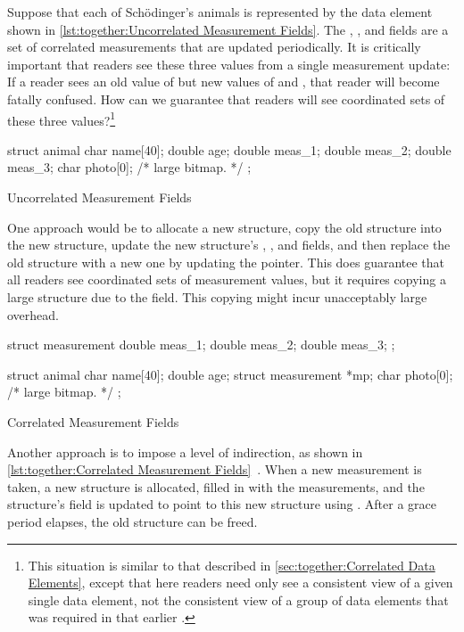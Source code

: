 Suppose that each of Sch\"odinger's animals is represented by the
data element shown in
\cref{lst:together:Uncorrelated Measurement Fields}.
The , , and  fields are a set
of correlated measurements that are updated periodically.
It is critically important that readers see these three values from
a single measurement update: If a reader sees an old value of
 but new values of  and , that
reader will become fatally confused.
How can we guarantee that readers will see coordinated sets of these
three values?\footnote{
	This situation is similar to that described in
	\cref{sec:together:Correlated Data Elements},
	except that here readers need only see a consistent view of a
	given single data element, not the consistent view of a
	group of data elements that was required in that earlier
	.}

\begin{listing}
\begin{VerbatimL}[tabsize=8]
struct animal {
	char name[40];
	double age;
	double meas_1;
	double meas_2;
	double meas_3;
	char photo[0]; /* large bitmap. */
};
\end{VerbatimL}
\caption{Uncorrelated Measurement Fields}
\label{lst:together:Uncorrelated Measurement Fields}
\end{listing}

One approach would be to allocate a new  structure,
copy the old structure into the new structure, update the new
structure's , , and  fields,
and then replace the old structure with a new one by updating
the pointer.
This does guarantee that all readers see coordinated sets of
measurement values, but it requires copying a large structure due
to the  field.
This copying might incur unacceptably large overhead.

\begin{listing}
\begin{VerbatimL}[tabsize=8]
struct measurement {
	double meas_1;
	double meas_2;
	double meas_3;
};

struct animal {
	char name[40];
	double age;
	struct measurement *mp;
	char photo[0]; /* large bitmap. */
};
\end{VerbatimL}
\caption{Correlated Measurement Fields}
\label{lst:together:Correlated Measurement Fields}
\end{listing}

Another approach is to impose a level of indirection, as shown in
\cref{lst:together:Correlated Measurement Fields}~\cite[Section 5.3.4]{PaulEdwardMcKenneyPhD}.
When a new measurement is taken, a new  structure
is allocated, filled in with the measurements, and the 
structure's  field is updated to point to this new
 structure using .
After a grace period elapses, the old  structure
can be freed.


